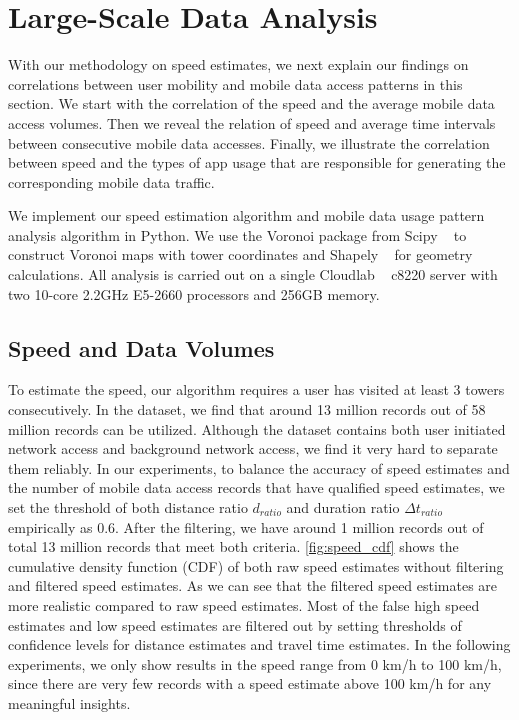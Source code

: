 \section{Large-Scale Data Analysis}\label{experiments}

With our methodology on speed estimates, we next explain our findings on correlations between user mobility and mobile data access patterns in this section. We start with the correlation of the speed and the average mobile data access volumes. Then we reveal the relation of speed and average time intervals between consecutive mobile data accesses. Finally, we illustrate the correlation between speed and the types of app usage that are responsible for generating the corresponding mobile data traffic.


We implement our speed estimation algorithm and mobile data usage pattern analysis algorithm in Python. We use the Voronoi package from Scipy ~\cite{scipy} to construct Voronoi maps with tower coordinates and Shapely ~\cite{shapely} for geometry calculations. All analysis is carried out on a single Cloudlab ~\cite{RicciEide:login14} c8220 server with two 10-core 2.2GHz E5-2660 processors and 256GB memory.


\subsection{Speed and Data Volumes}

To estimate the speed, our algorithm requires a user has visited at least 3 towers consecutively. In the dataset, we find that around 13 million records out of 58 million records can be utilized. Although the dataset contains both user initiated network access and background network access, we find it very hard to separate them reliably. In our experiments, to balance the accuracy of speed estimates and the number of mobile data access records that have qualified speed estimates, we set the threshold of both distance ratio $d_{ratio}$ and duration ratio $\Delta t_{ratio}$ empirically as 0.6. After the filtering, we have around 1 million records out of total 13 million records that meet both criteria. \autoref{fig:speed_cdf} shows the cumulative density function (CDF) of both raw speed estimates without filtering and filtered speed estimates. As we can see that the filtered speed estimates are more realistic compared to raw speed estimates. Most of the false high speed estimates and low speed estimates are filtered out by setting thresholds of confidence levels for distance estimates and travel time estimates.
In the following experiments, we only show results in the speed range from 0 km/h to 100 km/h, since there are very few records with a speed estimate above 100 km/h for any meaningful insights.


